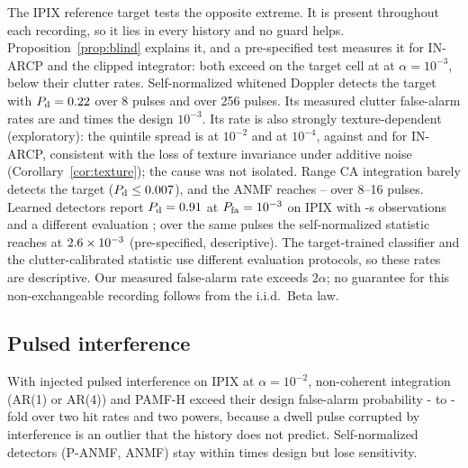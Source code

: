 \documentclass[journal]{IEEEtran}
\begin{document}
\label{sec:realtarget}The IPIX reference target tests the opposite extreme. It is present throughout each recording, so it lies in every history and no guard helps. Proposition~\ref{prop:blind} explains it, and a pre-specified test measures it for IN-ARCP and the clipped integrator: both exceed on the target cell at \TargetBlindRate{} at $\alpha=10^{-3}$, below their clutter rates. Self-normalized whitened Doppler detects the target with $P_{\rm d}=0.22$ over 8 pulses and \TPanmfTwoFiveSix{} over 256 pulses. Its measured clutter false-alarm rates are \TPanmfPfaEight{} and \TPanmfPfaTwoFiveSix{} times the design $10^{-3}$. Its rate is also strongly texture-dependent (exploratory): the quintile spread is \ConfSpreadPanmfTwo{} at $10^{-2}$ and \ConfSpreadPanmfFour{} at $10^{-4}$, against \ConfSpreadInTwo{} and \LInConfSpreadFour{} for IN-ARCP, consistent with the loss of texture invariance under additive noise (Corollary~\ref{cor:texture}); the cause was not isolated. Range CA integration barely detects the target ($P_{\rm d}\le0.007$), and the ANMF reaches \TFpEight--\TFpSixteen{} over 8--16 pulses. Learned detectors report $P_{\rm d}=0.91$ at $P_{\rm fa}=10^{-3}$ on IPIX with \TPanmfKiloSec-s observations and a different evaluation \cite{qu2023sensors}; over the same \TPanmfKiloPulses{} pulses the self-normalized statistic reaches \TPanmfThousand{} at $2.6\times10^{-3}$ (pre-specified, descriptive). The target-trained classifier and the clutter-calibrated statistic use different evaluation protocols, so these rates are descriptive. Our measured false-alarm rate exceeds $2\alpha$; no guarantee for this non-exchangeable recording follows from the i.i.d.\ Beta law.

\subsection{Pulsed interference}\label{sec:interf}
\begin{table}[!t]
\centering\footnotesize
\caption{Remedies for pulsed interference on IPIX ($\alpha=0.01$, \NUnitsConf{} units). Interference is injected 30~dB above the local power; each pulse is hit with probability $p_{\rm h}$, and bursts are eight pulses long at $p_{\rm h}=5\%$. Entries are the measured $P_{\rm fa}/\alpha$ and the $P_{\rm d}$ of a 10~dB persistent target. Trimmed: \TrimTwo{} ($2\%$) and \TrimFive{} ($5\%$) of eight terms discarded. Bold: $P_{\rm fa}/\alpha>1.2$.}
\label{tab:interf}
\setlength{\tabcolsep}{2.4pt}

\end{table}
With injected pulsed interference on IPIX at $\alpha=10^{-2}$, non-coherent integration (AR(1) or AR(4)) and PAMF-H exceed their design false-alarm probability \IPfaMinAll- to \IPfaMaxInt-fold over two hit rates and two powers, because a dwell pulse corrupted by interference is an outlier that the history does not predict. Self-normalized detectors (P-ANMF, ANMF) stay within \SelfNormIntMax{} times design but lose sensitivity.
\end{document}
